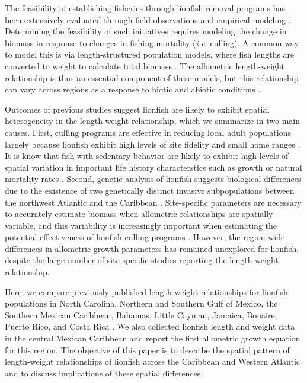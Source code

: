 \documentclass[fleqn,10pt,lineno]{wlpeerj} %
\begin{document}
The feasibility of establishing fisheries through lionfish removal
programs has been extensively evaluated through field observations and
empirical modeling
\citep{barbour_2011,morris_2011,deleon_2013,johnston_2015,sandel_2015,usseglio_2017}.
Determining the feasibility of such initiatives requires modeling the
change in biomass in response to changes in fishing mortality
(\emph{i.e.} culling). A common way to model this is via
length-structured population models, where fish lengths are converted to
weight to calculate total biomass
\citep{barbour_2011,cote_2014,andradibrown_2017}. The allometric
length-weight relationship is thus an essential component of these
models, but this relationship can vary across regions as a response to
biotic and abiotic conditions \citep{johnson_2016}.

Outcomes of previous studies suggest lionfish are likely to exhibit
spatial heterogeneity in the length-weight relationship, which we
summarize in two main causes. First, culling programs are effective in
reducing local adult populations largely because lionfish exhibit high
levels of site fidelity and small home ranges
\citep{Fishelson_1997,kochzius_2005,jud_2012,cote_2014}. It is know that
fish with sedentary behavior are likely to exhibit high levels of
spatial variation in important life history characterstics such as
growth or natural mortality rates
\citep{gunderson_2008,hutchinson_2008,wilson_2012,guan_2013}. Second,
genetic analysis of lionfish suggests biological differences due to the
existence of two genetically distinct invasive subpopulations between
the northwest Atlantic and the Caribbean \citep{betancurr_2011}.
Site-specific parameters are necessary to accurately estimate biomass
when allometric relationships are spatially variable, and this
variability is increasingly important when estimating the potential
effectiveness of lionfish culling programs
\citep{barbour_2011,morris_2011,cote_2014,johnston_2015}. However, the
region-wide differences in allometric growth parameters has remained
unexplored for lionfish, despite the large number of site-specific
studies reporting the length-weight relationship.

Here, we compare previously published length-weight relationships for
lionfish populations in North Carolina, Northern and Southern Gulf of
Mexico, the Southern Mexican Caribbean, Bahamas, Little Cayman, Jamaica,
Bonaire, Puerto Rico, and Costa Rica
\citep{barbour_2011,darling_2011,deleon_2013,fogg_2013,dahl_2014,edwards_2014,toledohernndez_2014,sandel_2015,aguilarperera_2016,sabidoitza_2016,sabidoitz_2016,chin_2016}.
We also collected lionfish length and weight data in the central Mexican
Caribbean and report the first allometric growth equation for this
region. The objective of this paper is to describe the spatial pattern
of length-weight relationships of lionfish across the Caribbean and
Western Atlantic and to discuss implications of these spatial
differences.
\end{document}

